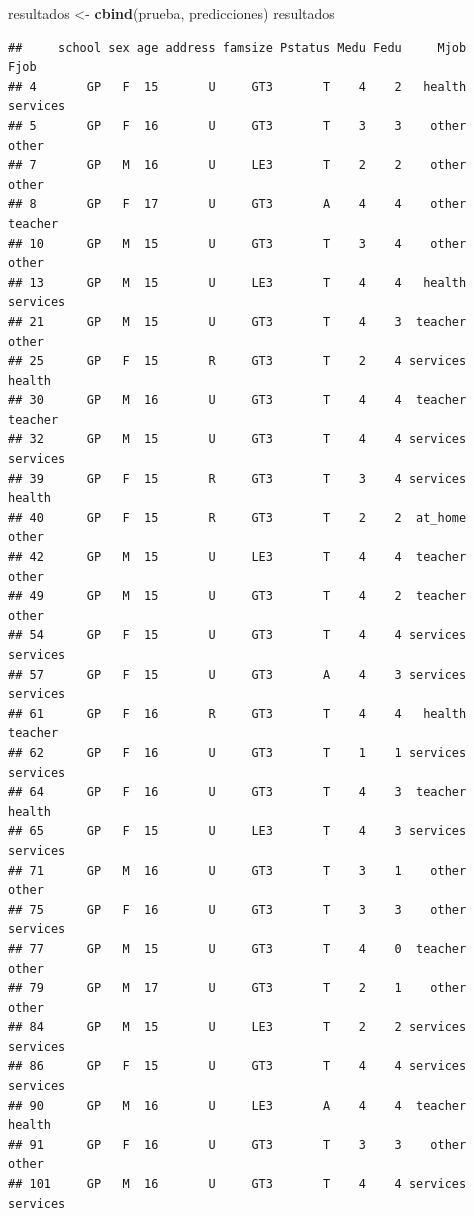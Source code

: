 \documentclass[
]{article}
\newenvironment{Shaded}{\begin{snugshade}}{\end{snugshade}}
\newcommand{\KeywordTok}[1]{\textcolor[rgb]{0.13,0.29,0.53}{\textbf{#1}}}
\newcommand{\NormalTok}[1]{#1}
\newcommand{\StringTok}[1]{\textcolor[rgb]{0.31,0.60,0.02}{#1}}
\begin{document}
\begin{Shaded}
\begin{Highlighting}[]
\NormalTok{resultados <-}\StringTok{ }\KeywordTok{cbind}\NormalTok{(prueba, predicciones)}
\NormalTok{resultados}
\end{Highlighting}
\end{Shaded}

\begin{verbatim}
##     school sex age address famsize Pstatus Medu Fedu     Mjob     Fjob
## 4       GP   F  15       U     GT3       T    4    2   health services
## 5       GP   F  16       U     GT3       T    3    3    other    other
## 7       GP   M  16       U     LE3       T    2    2    other    other
## 8       GP   F  17       U     GT3       A    4    4    other  teacher
## 10      GP   M  15       U     GT3       T    3    4    other    other
## 13      GP   M  15       U     LE3       T    4    4   health services
## 21      GP   M  15       U     GT3       T    4    3  teacher    other
## 25      GP   F  15       R     GT3       T    2    4 services   health
## 30      GP   M  16       U     GT3       T    4    4  teacher  teacher
## 32      GP   M  15       U     GT3       T    4    4 services services
## 39      GP   F  15       R     GT3       T    3    4 services   health
## 40      GP   F  15       R     GT3       T    2    2  at_home    other
## 42      GP   M  15       U     LE3       T    4    4  teacher    other
## 49      GP   M  15       U     GT3       T    4    2  teacher    other
## 54      GP   F  15       U     GT3       T    4    4 services services
## 57      GP   F  15       U     GT3       A    4    3 services services
## 61      GP   F  16       R     GT3       T    4    4   health  teacher
## 62      GP   F  16       U     GT3       T    1    1 services services
## 64      GP   F  16       U     GT3       T    4    3  teacher   health
## 65      GP   F  15       U     LE3       T    4    3 services services
## 71      GP   M  16       U     GT3       T    3    1    other    other
## 75      GP   F  16       U     GT3       T    3    3    other services
## 77      GP   M  15       U     GT3       T    4    0  teacher    other
## 79      GP   M  17       U     GT3       T    2    1    other    other
## 84      GP   M  15       U     LE3       T    2    2 services services
## 86      GP   F  15       U     GT3       T    4    4 services services
## 90      GP   M  16       U     LE3       A    4    4  teacher   health
## 91      GP   F  16       U     GT3       T    3    3    other    other
## 101     GP   M  16       U     GT3       T    4    4 services services

\end{verbatim}
\end{document}
